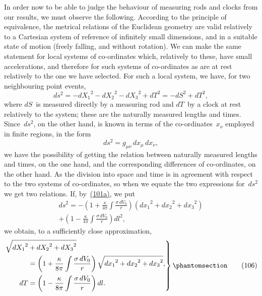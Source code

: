 \documentclass[12pt]{book}[2005/09/16]
\newcommand{\Change}[2]{#2}
\newcommand{\Add}[1]{\Change{}{#1}}
\newcommand{\PageSep}[1]{\ignorespaces}
\newcommand{\Tag}[1]{%
  \phantomsection
  \label{eqn:#1}
  \tag*{#1}
}
\newcommand{\Eqref}[1]{\hyperref[eqn:#1]{#1}}
\begin{document}
In order now to be able to judge the behaviour of
measuring rods and clocks from our results, we must
observe the following. According to the principle of
equivalence, the metrical relations of the Euclidean
geometry are valid relatively to a Cartesian system of
reference of infinitely small dimensions, and in a suitable
state of motion (freely falling, and without rotation).
We can make the same statement for local systems of
co-ordinates which, relatively to these, have small accelerations,
and therefore for such systems of co-ordinates
as are at rest relatively to the one we have selected. For
such a local system, we have, for two neighbouring point
events,
\[
ds^{2} = - {dX_{1}}^{2} - {dX_{2}}^{2} - {dX_{3}}^{2} + dT^{2}
  = - dS^{2} + dT^{2}\Add{,}
\]
where $dS$~is measured directly by a measuring rod and
$dT$~by a clock at rest relatively to the system; these are
\PageSep{100}
the naturally measured lengths and times. Since~$ds^{2}$, on
the other hand, is known in terms of the co-ordinates~$x_{\nu}$
employed in finite regions, in the form
\[
ds^{2} = g_{\mu\nu}\, dx_{\mu}\, dx_{\nu}\Add{,}
\]
we have the possibility of getting the relation between
naturally measured lengths and times, on the one hand,
and the corresponding differences of co-ordinates, on the
other hand. As the division into space and time is in
agreement with respect to the two systems of co-ordinates,
so when we equate the two expressions for~$ds^{2}$ we get
two relations. If, by~\Eqref{(101a)}, we put
\begin{multline*}
ds^{2} = -\left(1 + \frac{\kappa}{4\pi} \int \frac{\sigma\, dV_{0}}{r}\right)
  ({dx_{1}}^{2} + {dx_{2}}^{2} + {dx_{3}}^{2}) \\
  + \left(1 - \frac{\kappa}{4\pi} \int \frac{\sigma\, dV_{0}}{r}\right) dl^{2}\Add{,}
\end{multline*}
we obtain, to a sufficiently close approximation,
\[
\left.
\begin{aligned}
  &\sqrt{{dX_{1}}^{2} + {dX_{2}}^{2} + {dX_{3}}^{2}} \\
  &\qquad
  \begin{aligned}
  &= \left(1 + \frac{\kappa}{8\pi} \int \frac{\sigma\, dV_{0}}{r}\right)
     \sqrt{{dx_{1}}^{2} + {dx_{2}}^{2} + {dx_{3}}^{2}}\Add{,} \\
dT &= \left(1 - \frac{\kappa}{8\pi} \int \frac{\sigma\, dV_{0}}{r}\right) dl.
\end{aligned}
\end{aligned}
\right\}
\Tag{(106)}
\]
\end{document}
